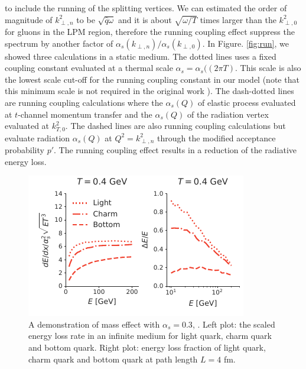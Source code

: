 \documentclass[aps, prc, reprint, amsmath, groupedaddress, nofootinbib]{revtex4-1}
\begin{document}
to include the running of the splitting vertices.
We can estimated the order of magnitude of $k_{\perp,n}^2$ to be $\sqrt{\hat{q}\omega}$ and it is about $\sqrt{\omega/T}$ times larger than the $k_{\perp,0}^2$ for gluons in the LPM region, therefore the running coupling effect suppress the spectrum by another factor of $\alpha_s(k_{\perp,n})/\alpha_s(k_{\perp,0})$.
In Figure. \ref{fig:run}, we showed three calculations in a static medium. The dotted lines uses a fixed coupling constant evaluated at a thermal scale $\alpha_s = \alpha_s((2\pi T)$.
This scale is also the lowest scale cut-off for the running coupling constant in our model (note that this minimum scale is not required in the original work \cite{Arnold:2008zu}).
The dash-dotted lines are running coupling calculations where the $\alpha_s(Q)$ of elastic process evaluated at $t$-channel momentum transfer and the $\alpha_s(Q)$ of the radiation vertex evaluated at $k_{T,0}^2$.
The dashed lines are also running coupling calculations but evaluate radiation $\alpha_s(Q)$ at $Q^2 = k_{\perp,n}^2$ through the modified acceptance probability $p'$.
The running coupling effect results in a reduction of the radiative energy loss.

\begin{figure}
\includegraphics[width=\columnwidth]{Eloss_mass.pdf}
\caption{A demonstration of mass effect with $\alpha_s=0.3$, . Left plot: the scaled energy loss rate in an infinite medium for light quark, charm quark and bottom quark. Right plot: energy loss fraction of light quark, charm quark and bottom quark at path length $L=4$ fm.  }
\label{fig:mass}
\end{figure}
\end{document}
